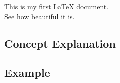 This is my first LaTeX document. \\ See how beautiful it is.
\subsection*{Concept Explanation}

\subsection*{Example}
